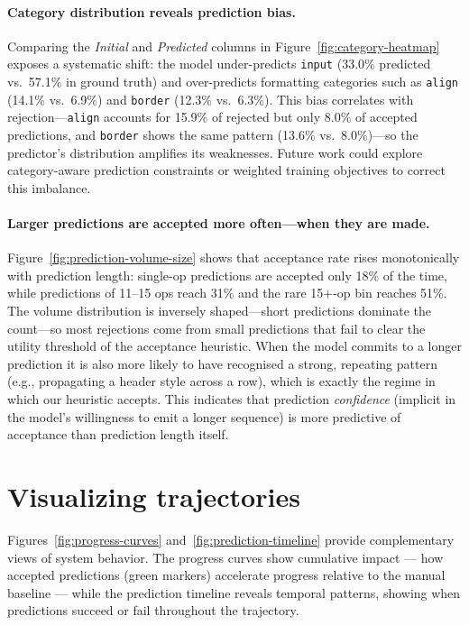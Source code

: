 \documentclass{article}
\newcommand{\op}[1]{\texttt{\small #1}}
\theoremstyle{plain}
\theoremstyle{definition}
\theoremstyle{remark}
\begin{document}
\paragraph{Category distribution reveals prediction bias.}
Comparing the \emph{Initial} and \emph{Predicted} columns in Figure~\ref{fig:category-heatmap} exposes a systematic shift: the model under-predicts \op{input} (33.0\% predicted vs.\ 57.1\% in ground truth) and over-predicts formatting categories such as \op{align} (14.1\% vs.\ 6.9\%) and \op{border} (12.3\% vs.\ 6.3\%).
This bias correlates with rejection---\op{align} accounts for 15.9\% of rejected but only 8.0\% of accepted predictions, and \op{border} shows the same pattern (13.6\% vs.\ 8.0\%)---so the predictor's distribution amplifies its weaknesses.
Future work could explore category-aware prediction constraints or weighted training objectives to correct this imbalance.



\paragraph{Larger predictions are accepted more often---when they are made.}
Figure~\ref{fig:prediction-volume-size} shows that acceptance rate rises monotonically with prediction length: single-op predictions are accepted only 18\% of the time, while predictions of 11--15 ops reach 31\% and the rare 15+-op bin reaches 51\%.
The volume distribution is inversely shaped---short predictions dominate the count---so most rejections come from small predictions that fail to clear the utility threshold of the acceptance heuristic.
When the model commits to a longer prediction it is also more likely to have recognised a strong, repeating pattern (e.g., propagating a header style across a row), which is exactly the regime in which our heuristic accepts.
This indicates that prediction \emph{confidence} (implicit in the model's willingness to emit a longer sequence) is more predictive of acceptance than prediction length itself.



\section{Visualizing trajectories}
Figures~\ref{fig:progress-curves} and~\ref{fig:prediction-timeline} provide complementary views of system behavior. The progress curves show cumulative impact --- how accepted predictions (green markers) accelerate progress relative to the manual baseline --- while the prediction timeline reveals temporal patterns, showing when predictions succeed or fail throughout the trajectory.
\end{document}
